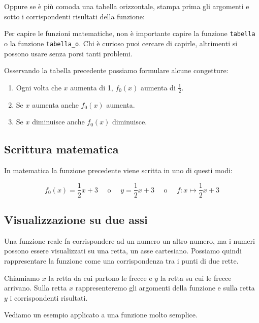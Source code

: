 Oppure se è più comoda una tabella orizzontale, stampa prima gli 
argomenti e sotto i corrispondenti risultati della funzione:


\begin{osservazione}
Per capire le funzioni matematiche, non è importante capire 
la funzione \texttt{tabella} o la funzione \texttt{tabella\_o}.
Chi è curioso puoi cercare di capirle, altrimenti si possono usare senza 
porsi tanti problemi.
\end{osservazione}

Osservando la tabella precedente possiamo formulare alcune congetture:

\begin{enumerate} [nosep]
\item Ogni volta che $x$ aumenta di 1, $f_0(x)$ aumenta di $\frac{1}{2}$.
\item Se $x$ aumenta anche $f_0(x)$ aumenta.
\item Se $x$ diminuisce anche $f_0(x)$ diminuisce.
\end{enumerate}

\subsection{Scrittura matematica}

In matematica la funzione precedente viene scritta in uno di questi modi:

$$f_0(x) = \frac{1}{2}x +3 \quad \text{ o } \quad 
y= \frac{1}{2}x +3 \quad \text{ o } \quad 
f: x \mapsto \frac{1}{2}x +3$$

\subsection{Visualizzazione su due assi}

Una funzione reale fa corrispondere ad un numero un altro numero, ma i 
numeri possono essere visualizzati su una retta, un asse cartesiano. 
Possiamo quindi rappresentare la funzione come una corrispondenza tra i 
punti di due rette.

Chiamiamo $x$ la retta da cui partono le frecce e $y$ la retta su cui le 
frecce arrivano.
Sulla retta $x$ rappresenteremo gli argomenti della funzione e sulla retta 
$y$ i corrispondenti risultati.

\dueassivuoti

Vediamo un esempio applicato a una funzione molto semplice.

